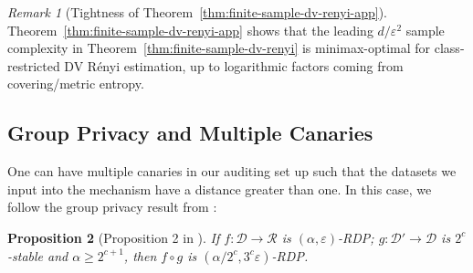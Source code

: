 \documentclass{article}
\theoremstyle{plain}
\newtheorem{theorem}{Theorem}[section]
\newtheorem{proposition}[theorem]{Proposition}
\theoremstyle{definition}
\theoremstyle{remark}
\newtheorem{remark}[theorem]{Remark}
\begin{document}
\begin{remark}[Tightness of Theorem~\ref{thm:finite-sample-dv-renyi-app}]
Theorem~\ref{thm:finite-sample-dv-renyi-app} shows that the leading $d/\varepsilon^2$
sample complexity in Theorem~\ref{thm:finite-sample-dv-renyi} is minimax-optimal for class-restricted DV R\'enyi estimation,
up to logarithmic factors coming from covering/metric entropy.
\end{remark}

\subsection{Group Privacy and Multiple Canaries}
One can have multiple canaries in our auditing set up such that the datasets we input into the mechanism have a distance greater than  one. In this case, we follow the group privacy result from \cite{mironov2017renyi}:
\begin{proposition}[Proposition 2 in \cite{mironov2017renyi}]
If $f : \mathcal{D} \to \mathcal{R}$ is $(\alpha,\varepsilon)$-RDP; 
$g : \mathcal{D}' \to \mathcal{D}$ is $2^c$-stable and $\alpha \ge 2^{c+1}$, 
then $f \circ g$ is $(\alpha / 2^c, 3^c \varepsilon)$-RDP.
\end{proposition}
\end{document}

